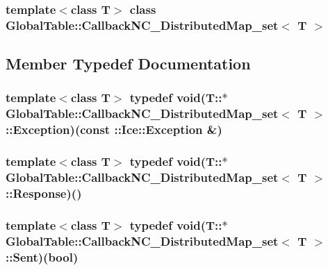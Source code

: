 \subsubsection*{template$<$class T$>$ class GlobalTable::CallbackNC\_\-DistributedMap\_\-set$<$ T $>$}



\subsection{Member Typedef Documentation}
\hypertarget{class_global_table_1_1_callback_n_c___distributed_map__set_afabef2e6a31d7617d88daa1e62b65d27}{
\subsubsection[{Exception}]{\setlength{\rightskip}{0pt plus 5cm}template$<$class T$>$ typedef void(T::$\ast$ {\bf GlobalTable::CallbackNC\_\-DistributedMap\_\-set}$<$ T $>$::{\bf Exception})(const ::Ice::Exception \&)}}
\label{class_global_table_1_1_callback_n_c___distributed_map__set_afabef2e6a31d7617d88daa1e62b65d27}
\hypertarget{class_global_table_1_1_callback_n_c___distributed_map__set_a7445ecdd91bde149b92e19754db630e0}{
\subsubsection[{Response}]{\setlength{\rightskip}{0pt plus 5cm}template$<$class T$>$ typedef void(T::$\ast$ {\bf GlobalTable::CallbackNC\_\-DistributedMap\_\-set}$<$ T $>$::{\bf Response})()}}
\label{class_global_table_1_1_callback_n_c___distributed_map__set_a7445ecdd91bde149b92e19754db630e0}
\hypertarget{class_global_table_1_1_callback_n_c___distributed_map__set_ac7f200ec224e006c6471dac69dd79509}{
\subsubsection[{Sent}]{\setlength{\rightskip}{0pt plus 5cm}template$<$class T$>$ typedef void(T::$\ast$ {\bf GlobalTable::CallbackNC\_\-DistributedMap\_\-set}$<$ T $>$::{\bf Sent})(bool)}}
